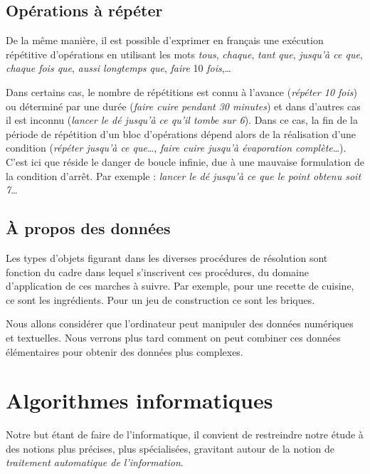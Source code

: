 	\subsection{Opérations à répéter}

		De la même manière, il est possible d’exprimer en français une exécution
		répétitive d’opérations en utilisant les mots \textit{tous},
		\textit{chaque}, \textit{tant que}, \textit{jusqu’à ce que},
		\textit{chaque fois que}, \textit{aussi longtemps que}, \textit{faire}
		10\textit{ fois},\dots 
		
		Dans certains cas, le nombre de répétitions est connu à l’avance
		(\textit{répéter 10 fois}) ou déterminé par une durée (\textit{faire
		cuire pendant 30 minutes}) et dans d’autres cas il est inconnu
		(\textit{lancer le dé jusqu'à ce
		qu'il tombe sur 6}). Dans ce cas, la fin de la période
		de répétition d’un bloc d’opérations dépend alors de la réalisation
		d’une condition (\textit{répéter jusqu’à ce que}…, \textit{faire cuire
		jusqu’à évaporation complète}…). C’est ici que réside le danger de
		boucle infinie, due à une mauvaise formulation de la condition d’arrêt.
		Par exemple : \textit{lancer le dé jusqu’à ce que le point obtenu soit
		7}\dots

	\subsection{À propos des données}

		Les types d’objets figurant dans les diverses procédures de résolution
		sont fonction du cadre dans lequel s’inscrivent ces procédures, du
		domaine d’application de ces marches à suivre. Par exemple, pour une
		recette de cuisine, ce sont les ingrédients. Pour un jeu de
		construction ce sont les briques.
		
		Nous allons considérer que l'ordinateur peut manipuler
		des données numériques et textuelles. Nous verrons plus tard comment on
		peut combiner ces données élémentaires pour obtenir des données plus
		complexes.

\section{Algorithmes informatiques}

	Notre but étant de faire de l’informatique, il convient de restreindre
	notre étude à des notions plus précises, plus spécialisées, gravitant
	autour de la notion de \textit{traitement automatique de
	l’information}.

